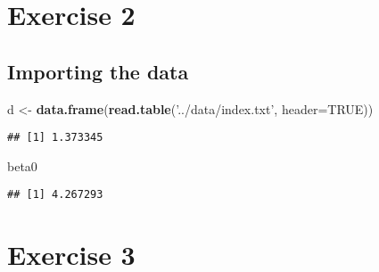 \documentclass[]{article}
\newenvironment{Shaded}{\begin{snugshade}}{\end{snugshade}}
\newcommand{\DataTypeTok}[1]{\textcolor[rgb]{0.13,0.29,0.53}{#1}}
\newcommand{\KeywordTok}[1]{\textcolor[rgb]{0.13,0.29,0.53}{\textbf{#1}}}
\newcommand{\NormalTok}[1]{#1}
\newcommand{\OperatorTok}[1]{\textcolor[rgb]{0.81,0.36,0.00}{\textbf{#1}}}
\newcommand{\OtherTok}[1]{\textcolor[rgb]{0.56,0.35,0.01}{#1}}
\newcommand{\StringTok}[1]{\textcolor[rgb]{0.31,0.60,0.02}{#1}}
\begin{document}
\hypertarget{exercise-2}{%
\section{Exercise 2}\label{exercise-2}}

\hypertarget{importing-the-data}{%
\subsection{Importing the data}\label{importing-the-data}}

\begin{Shaded}
\begin{Highlighting}[]
\NormalTok{d <-}\StringTok{ }\KeywordTok{data.frame}\NormalTok{(}\KeywordTok{read.table}\NormalTok{(}\StringTok{'../data/index.txt'}\NormalTok{, }\DataTypeTok{header=}\OtherTok{TRUE}\NormalTok{))}
\end{Highlighting}
\end{Shaded}

\begin{Shaded}
\end{Shaded}

\begin{verbatim}
## [1] 1.373345
\end{verbatim}

\begin{Shaded}
\begin{Highlighting}[]
\NormalTok{beta0}
\end{Highlighting}
\end{Shaded}

\begin{verbatim}
## [1] 4.267293
\end{verbatim}

\hypertarget{exercise-3}{%
\section{Exercise 3}\label{exercise-3}}
\end{document}

